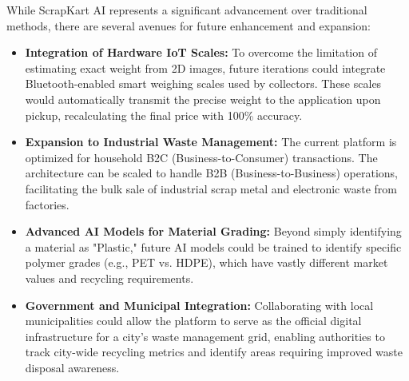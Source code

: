 While ScrapKart AI represents a significant advancement over traditional methods, there are several avenues for future enhancement and expansion:
\begin{itemize}
    \item \textbf{Integration of Hardware IoT Scales:} To overcome the limitation of estimating exact weight from 2D images, future iterations could integrate Bluetooth-enabled smart weighing scales used by collectors. These scales would automatically transmit the precise weight to the application upon pickup, recalculating the final price with 100\% accuracy.
    \item \textbf{Expansion to Industrial Waste Management:} The current platform is optimized for household B2C (Business-to-Consumer) transactions. The architecture can be scaled to handle B2B (Business-to-Business) operations, facilitating the bulk sale of industrial scrap metal and electronic waste from factories.
    \item \textbf{Advanced AI Models for Material Grading:} Beyond simply identifying a material as "Plastic," future AI models could be trained to identify specific polymer grades (e.g., PET vs. HDPE), which have vastly different market values and recycling requirements.
    \item \textbf{Government and Municipal Integration:} Collaborating with local municipalities could allow the platform to serve as the official digital infrastructure for a city's waste management grid, enabling authorities to track city-wide recycling metrics and identify areas requiring improved waste disposal awareness.
\end{itemize}
